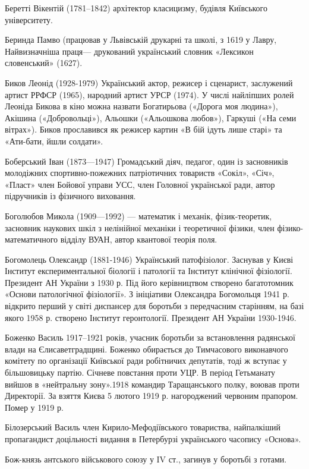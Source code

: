 Беретті Вікентій (1781–1842) архітектор класицизму, будівля Київського університету.

Беринда  Памво (працював у Львівській друкарні та школі, з 1619 у Лавру, Найвизначніша праця— друкований український словник «Лексикон словенський» (1627).

Биков Леонід (1928-1979) Український актор, режисер і сценарист, заслужений артист РРФСР (1965), народний артист УРСР (1974). У числі найліпших ролей Леоніда Бикова в кіно можна назвати Богатирьова («Дорога моя людина»), Акішина («Добровольці»), Альошки («Альошкова любов»), Гаркуші («На семи вітрах»). Биков прославився як режисер картин «В бій ідуть лише старі» та «Ати-бати, йшли солдати».

Боберський Іван (1873—1947) Громадський діяч, педагог, один із засновників молодіжних спортивно-пожежних патріотичних товариств «Сокіл», «Січ», «Пласт» член Бойової управи УСС, член Головної української ради, автор підручників із фізичного виховання.

Боголюбов Микола (1909—1992) — математик і механік, фізик-теоретик, засновник наукових шкіл з нелінійної механіки і теоретичної фізики, член фізико-математичного відділу ВУАН, автор квантової теорія поля.

Богомолець Олександр (1881-1946) Український патофізіолог. Заснував у Києві Інститут експериментальної біології і патології та Інститут клінічної фізіології. Президент АН України з 1930 р. Під його керівництвом створено багатотомник «Основи патологічної фізіології». З ініціативи Олександра Богомольця 1941 р. відкрито перший у світі диспансер для боротьби з передчасним старінням, на базі якого 1958 р. створено Інститут геронтології. Президент АН України 1930-1946.

Боженко Василь 1917–1921 років, учасник боротьби за встановлення радянської влади  на Єлисаветградщині. Боженко обирається до Тимчасового виконавчого комітету по організації Київської ради робітничих депутатів, тоді ж вступає у більшовицьку партію. Січневе повстання проти УЦР. В період Гетьманату вийшов в «нейтральну зону».1918 командир Таращанського полку, воював проти Директорії. За взяття Києва 5 лютого 1919 р. нагороджений червоним прапором. Помер у 1919 р.

Білозерський Василь член Кирило-Мефодіївського товариства, найпалкіший пропагандист доцільності видання в Петербурзі українського часопису «Основа». 

Бож-князь антського військового союзу у IV ст., загинув у боротьбі з готами.

